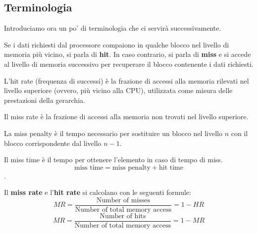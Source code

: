 \subsection{Terminologia}
Introduciamo ora un po' di terminologia che ci servirà successivamente.

\begin{definition}
Se i dati richiesti dal processore compaiono in qualche blocco nel livello di memoria più vicino, si parla di \textbf{hit}. In caso contrario, si parla di \textbf{miss} e si accede al livello di memoria successivo per recuperare il blocco contenente i dati richiesti.
\end{definition}

\begin{definition}
    L'hit rate (frequenza di successi) è la frazione di accessi alla memoria rilevati nel livello superiore (ovvero, più vicino alla CPU), utilizzata come misura delle prestazioni della gerarchia.
\end{definition}

\begin{definition}
    Il miss rate è la frazione di accessi alla memoria non trovati nel livello superiore.
\end{definition}

\begin{definition}
    La miss penalty è il tempo necessario per sostituire un blocco nel livello $n$ con il blocco corrispondente dal livello $n-1$.
\end{definition}

\begin{definition}
    Il miss time è il tempo per ottenere l'elemento in caso di tempo di miss. 
    \begin{equation*}
    	\text{miss time} = \text{miss penalty} + \text{hit time}
    \end{equation*}.
\end{definition}

\noindent Il \textbf{miss rate} e l'\textbf{hit rate} si calcolano con le seguenti formule:
\begin{equation}
    MR = \frac{\text{Number of misses}}{\text{Number of total memory access}} = 1 - HR
\end{equation}
\begin{equation}
    MR = \frac{\text{Number of hits}}{\text{Number of total memory access}} = 1 - MR
\end{equation}

